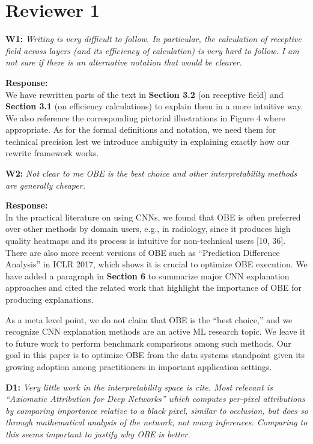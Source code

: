 \documentclass[preprint]{vldb}
\begin{document}
\section{Reviewer 1}

\vspace{2mm}
\noindent \textbf{W1:} \textit{Writing is very difficult to follow. In particular, the calculation of receptive field across layers (and its efficiency of calculation) is very hard to follow. I am not sure if there is an alternative notation that would be clearer.}

\vspace{2mm}
\noindent \textbf{Response:}\\
We have rewritten parts of the text in \textbf{Section 3.2} (on receptive field) and \textbf{Section 3.1} (on efficiency calculations) to explain them in a more intuitive way. We also reference the corresponding pictorial illustrations in Figure 4 where appropriate. As for the formal definitions and notation, we need them for technical precision lest we introduce ambiguity in explaining exactly how our rewrite framework works.

\vspace{2mm}
\noindent \textbf{W2:} \textit{Not clear to me OBE is the best choice and other interpretability methods are generally cheaper.}

\vspace{2mm}
\noindent \textbf{Response:} \\
In the practical literature on using CNNs, we found that OBE is often preferred over other methods by domain users, e.g., in radiology, since it produces high quality heatmaps and its process is intuitive for  non-technical users [10, 36]. There are also more recent versions of OBE such as ``Prediction Difference Analysis'' in ICLR 2017, which shows it is crucial to optimize OBE execution. We have added a paragraph in \textbf{Section 6} to summarize major CNN explanation approaches and cited the related work that highlight the importance of OBE for producing explanations. 

As a meta level point, we do not claim that OBE is the ``best choice,'' and we recognize CNN explanation methods are an active ML research topic. We leave it to future work to perform benchmark comparisons among such methods. Our goal in this paper is to optimize OBE from the data systems standpoint given its growing adoption among practitioners in important application settings. 

\vspace{2mm}
\noindent \textbf{D1:} \textit{Very little work in the interpretability space is cite. Most relevant is ``Axiomatic Attribution for Deep Networks'' which computes per-pixel attributions by comparing importance relative to a black pixel, similar to occlusion, but does so through mathematical analysis of the network, not many inferences. Comparing to this seems important to justify why OBE is better.}
\end{document}
